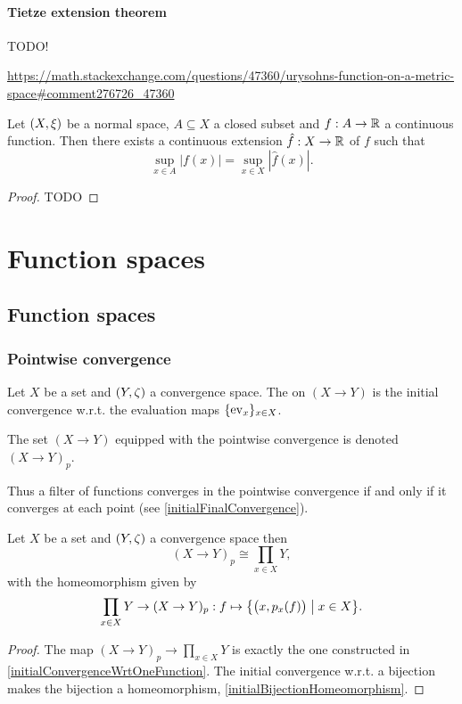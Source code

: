 \subsubsection{Tietze extension theorem}
TODO!

\url{https://math.stackexchange.com/questions/47360/urysohns-function-on-a-metric-space#comment276726_47360}

\begin{theorem} \label{TietzeExtension}
Let $\sSet{X,\xi}$ be a normal space, $A\subseteq X$ a closed subset and $f:A\to \mathbb{R}$ a continuous function. Then there exists a continuous extension $\hat{f}: X\to \mathbb{R}$ of $f$ such that
\[ \sup_{x\in A}|f(x)| = \sup_{x\in X}|\hat{f}(x)|. \]
\end{theorem}
\begin{proof}
TODO
\end{proof}



\chapter{Function spaces}
\section{Function spaces}
\subsection{Pointwise convergence}
\begin{definition}
Let $X$ be a set and $\sSet{Y,\zeta}$ a convergence space. The  on $(X\to Y)$ is the initial convergence w.r.t. the evaluation maps $\{\operatorname{ev}_x\}_{x\in X}$.

The set $(X\to Y)$ equipped with the pointwise convergence is denoted $(X\to Y)_p$.
\end{definition}
Thus a filter of functions converges in the pointwise convergence if and only if it converges at each point (see \ref{initialFinalConvergence}).

\begin{proposition} \label{pointwiseConvergenceProductSpace}
Let $X$ be a set and $\sSet{Y,\zeta}$ a convergence space then
\[ (X\to Y)_p \cong \prod_{x\in X}Y, \]
with the homeomorphism given by
\[ \prod_{x\in X}Y \to (X\to Y)_p: f\mapsto \setbuilder{\big(x,p_x(f)\big)}{x\in X}. \]
\end{proposition}
\begin{proof}
The map $(X\to Y)_p \to \prod_{x\in X}Y$ is exactly the one constructed in \ref{initialConvergenceWrtOneFunction}. The initial convergence w.r.t. a bijection makes the bijection a homeomorphism, \ref{initialBijectionHomeomorphism}.
\end{proof}


